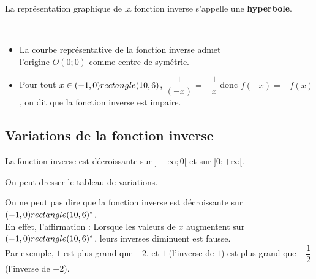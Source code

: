   \begin{minipage}[c]{0.55\linewidth}
  \begin{Définition}
  La représentation graphique de la fonction inverse s'appelle une {\bf{hyperbole}}. 
  \end{Définition}
  
  
  \begin{Propriété} $ $
  \begin{itemize}[label=\textcolor{Couleur2}{$\bullet$}]
\item La courbe représentative de la fonction inverse admet \\l'origine $O(0;0)$ comme centre de symétrie.\\
\item Pour tout $x\in (-1,0) rectangle (10,6)$, $\dfrac{1}{(-x)}=-\dfrac{1}{x}$ donc $f(-x)=-f(x)$, on dit que la fonction inverse est impaire.
\end{itemize}
  \end{Propriété}
  \end{minipage}
  
\newpage  
  
\subsection{Variations de la fonction inverse}
\begin{Propriété}
La fonction inverse est décroissante sur $]-\infty ; 0 [ $ et sur $]0 ; +\infty [$.
\end{Propriété}
On peut dresser le tableau de variations.
\begin{center}
      \end{center}

\begin{Remarque}
On ne peut pas dire que la fonction inverse est décroissante sur $(-1,0) rectangle (10,6)^\ast$. \\En effet, l'affirmation : \og Lorsque les valeurs de $x$ augmentent sur $(-1,0) rectangle (10,6)^\ast$, leurs inverses diminuent \fg{} est fausse. \\Par exemple, $1$ est plus grand que $-2$, et $1$ (l'inverse de $1$) est plus grand que $-\dfrac{1}{2}$ (l'inverse de $-2$).

\end{Remarque}


